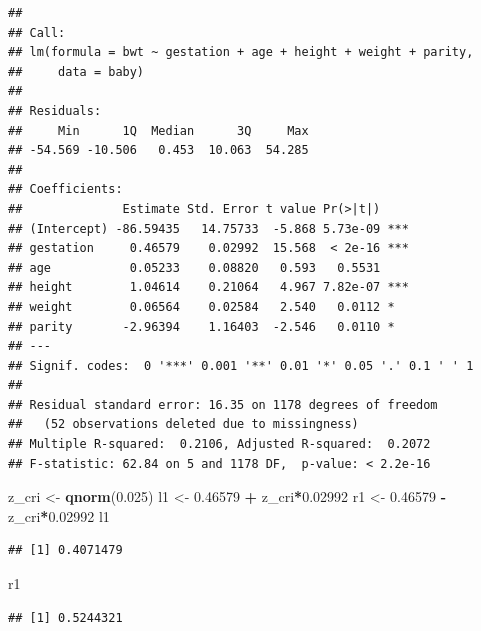 \documentclass[]{article}
\newenvironment{Shaded}{\begin{snugshade}}{\end{snugshade}}
\newcommand{\FloatTok}[1]{\textcolor[rgb]{0.00,0.00,0.81}{#1}}
\newcommand{\KeywordTok}[1]{\textcolor[rgb]{0.13,0.29,0.53}{\textbf{#1}}}
\newcommand{\NormalTok}[1]{#1}
\newcommand{\OperatorTok}[1]{\textcolor[rgb]{0.81,0.36,0.00}{\textbf{#1}}}
\newcommand{\StringTok}[1]{\textcolor[rgb]{0.31,0.60,0.02}{#1}}
\begin{document}
\begin{Shaded}
\end{Shaded}

\begin{verbatim}
## 
## Call:
## lm(formula = bwt ~ gestation + age + height + weight + parity, 
##     data = baby)
## 
## Residuals:
##     Min      1Q  Median      3Q     Max 
## -54.569 -10.506   0.453  10.063  54.285 
## 
## Coefficients:
##              Estimate Std. Error t value Pr(>|t|)    
## (Intercept) -86.59435   14.75733  -5.868 5.73e-09 ***
## gestation     0.46579    0.02992  15.568  < 2e-16 ***
## age           0.05233    0.08820   0.593   0.5531    
## height        1.04614    0.21064   4.967 7.82e-07 ***
## weight        0.06564    0.02584   2.540   0.0112 *  
## parity       -2.96394    1.16403  -2.546   0.0110 *  
## ---
## Signif. codes:  0 '***' 0.001 '**' 0.01 '*' 0.05 '.' 0.1 ' ' 1
## 
## Residual standard error: 16.35 on 1178 degrees of freedom
##   (52 observations deleted due to missingness)
## Multiple R-squared:  0.2106, Adjusted R-squared:  0.2072 
## F-statistic: 62.84 on 5 and 1178 DF,  p-value: < 2.2e-16
\end{verbatim}

\begin{Shaded}
\begin{Highlighting}[]
\NormalTok{z_cri <-}\StringTok{ }\KeywordTok{qnorm}\NormalTok{(}\FloatTok{0.025}\NormalTok{)}
\NormalTok{l1 <-}\StringTok{ }\FloatTok{0.46579} \OperatorTok{+}\StringTok{ }\NormalTok{z_cri}\OperatorTok{*}\FloatTok{0.02992}
\NormalTok{r1 <-}\StringTok{ }\FloatTok{0.46579} \OperatorTok{-}\StringTok{ }\NormalTok{z_cri}\OperatorTok{*}\FloatTok{0.02992}
\NormalTok{l1}
\end{Highlighting}
\end{Shaded}

\begin{verbatim}
## [1] 0.4071479
\end{verbatim}

\begin{Shaded}
\begin{Highlighting}[]
\NormalTok{r1}
\end{Highlighting}
\end{Shaded}

\begin{verbatim}
## [1] 0.5244321
\end{verbatim}
\end{document}
